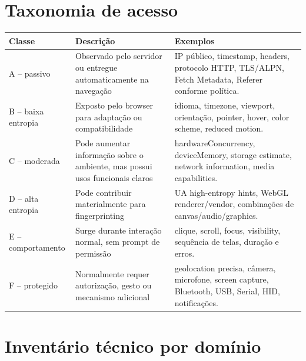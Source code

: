 \documentclass[11pt,a4paper]{article}
\begin{document}
\section{Taxonomia de acesso}
\begin{longtable}{p{2.5cm}p{4.2cm}p{7.4cm}}
\toprule
\textbf{Classe} & \textbf{Descrição} & \textbf{Exemplos}\\\midrule\endhead
A -- passivo & Observado pelo servidor ou entregue automaticamente na navegação & IP público, timestamp, headers, protocolo HTTP, TLS/ALPN, Fetch Metadata, Referer conforme política.\\
B -- baixa entropia & Exposto pelo browser para adaptação ou compatibilidade & idioma, timezone, viewport, orientação, pointer, hover, color scheme, reduced motion.\\
C -- moderada & Pode aumentar informação sobre o ambiente, mas possui usos funcionais claros & hardwareConcurrency, deviceMemory, storage estimate, network information, media capabilities.\\
D -- alta entropia & Pode contribuir materialmente para fingerprinting & UA high-entropy hints, WebGL renderer/vendor, combinações de canvas/audio/graphics.\\
E -- comportamento & Surge durante interação normal, sem prompt de permissão & clique, scroll, focus, visibility, sequência de telas, duração e erros.\\
F -- protegido & Normalmente requer autorização, gesto ou mecanismo adicional & geolocation precisa, câmera, microfone, screen capture, Bluetooth, USB, Serial, HID, notificações.\\
\bottomrule
\end{longtable}

\section{Inventário técnico por domínio}
\end{document}
